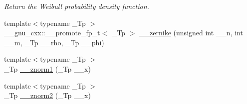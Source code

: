 \begin{DoxyCompactItemize}
\begin{DoxyCompactList}\small\item\em Return the Weibull probability density function. \end{DoxyCompactList}\item 
{\footnotesize template$<$typename \+\_\+\+Tp $>$ }\\\+\_\+\+\_\+gnu\+\_\+cxx\+::\+\_\+\+\_\+promote\+\_\+fp\+\_\+t$<$ \+\_\+\+Tp $>$ \hyperlink{namespacestd_1_1____detail_aa09d6c12ea20927f2ea5f7a1ba2f8319}{\+\_\+\+\_\+zernike} (unsigned int \+\_\+\+\_\+n, int \+\_\+\+\_\+m, \+\_\+\+Tp \+\_\+\+\_\+rho, \+\_\+\+Tp \+\_\+\+\_\+phi)
\item 
{\footnotesize template$<$typename \+\_\+\+Tp $>$ }\\\+\_\+\+Tp \hyperlink{namespacestd_1_1____detail_a6827b123253cc6a19947406339738bd7}{\+\_\+\+\_\+znorm1} (\+\_\+\+Tp \+\_\+\+\_\+x)
\item 
{\footnotesize template$<$typename \+\_\+\+Tp $>$ }\\\+\_\+\+Tp \hyperlink{namespacestd_1_1____detail_adf930b70ca943c6810ac7d2ea78d2cc3}{\+\_\+\+\_\+znorm2} (\+\_\+\+Tp \+\_\+\+\_\+x)
\end{DoxyCompactItemize}
